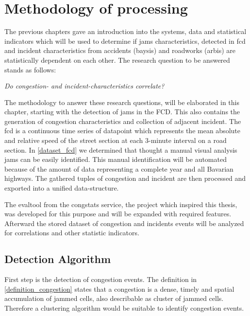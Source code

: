 \chapter{Methodology of processing}
\label{methodology}
The previous chapters gave an introduction into the systems, data and statistical indicators which will be used to determine if jams characteristics, detected in \acrshort{fcd} and incident characteristics from accidents (\acrshort{baysis}) and roadworks (\acrshort{arbis}) are statistically dependent on each other. The research question to be answered stands as follows:

\begin{center}
	\textit{Do congestion- and incident-characteristics correlate?}
\end{center}

\medskip

The methodology to answer these research questions, will be elaborated in this chapter, starting with the detection of jams in the FCD. This also contains the generation of congestion characteristics and collection of adjacent incident. The \acrshort{fcd} is a continuous time series of datapoint which represents the mean absolute and relative speed of the street section at each 3-minute interval on a road section. In \ref{dataset_fcd} we determined that thought a manual visual analysis jams can be easily identified. This manual identification will be automated because of the amount of data representing a complete year and all Bavarian highways. The gathered tuples of congestion and incident are then processed and exported into a unified data-structure. 

The \gls{evaltool} from the \gls{congstats} service, the project which inspired this thesis, was developed for this purpose and will be expanded with required features. Afterward the stored dataset of congestion and incidents events will be analyzed for correlations and other statistic indicators.

\bigskip

\section{Detection Algorithm}
\label{methodology_detection}
First step is the detection of congestion events. The definition in \ref{definition_congestion} states that a congestion is a dense, timely and spatial accumulation of jammed cells, also describable as cluster of jammed cells. Therefore a clustering algorithm would be suitable to identify congestion events.

